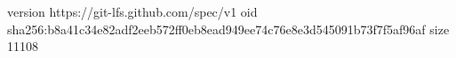 version https://git-lfs.github.com/spec/v1
oid sha256:b8a41c34e82adf2eeb572ff0eb8ead949ee74c76e8e3d545091b73f7f5af96af
size 11108

